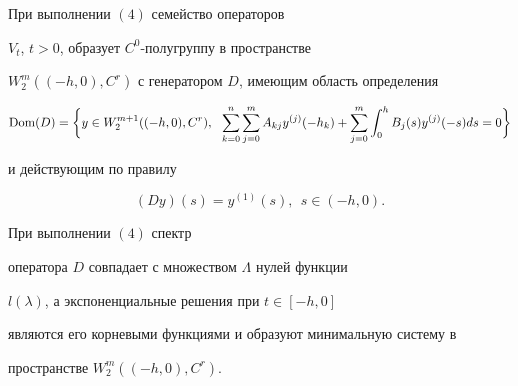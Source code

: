 \begin{lem}


При выполнении $(4)$ семейство операторов


$V_t$, $t>0$, образует $C^0$-полугруппу в пространстве


$W_2^m((-h,0),C^r)$ с генератором $D$, имеющим область определения


$$




\Dom(D)=\bigg\{y\in W_2^{m+1}((-h,0),C^r),\ \


%




\sum\limits_{k=0}^n\sum\limits_{j=0}^m  A_{kj}y^{(j)}(-h_k)+


\sum\limits_{j=0}^m\int_0^h B_j(s)y^{(j)}(-s)ds=0\bigg\}




$$


и действующим по правилу


$$


(Dy)(s)=y^{(1)}(s),\ \ s\in (-h,0).


$$


\end{lem}





\begin{prop}


При выполнении $(4)$  спектр


оператора $D$ совпадает с множеством $\Lambda$ нулей функции


$l(\lambda)$, а экспоненциальные решения при $t\in [-h,0]$


являются его корневыми функциями и образуют минимальную систему в


пространстве $W_2^m((-h,0),C^r)$.


\end{prop}





